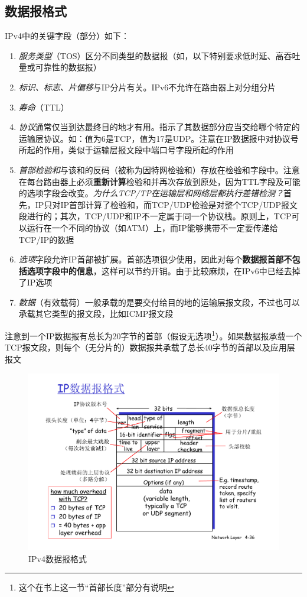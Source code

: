 \documentclass[]{report}
\begin{document}
		\subsection{数据报格式}
		IPv4中的关键字段（部分）如下：
		\begin{enumerate}
			\item \textit{服务类型}（TOS）区分不同类型的数据报（如，以下特别要求低时延、高吞吐量或可靠性的数据报）
			\item \textit{标识、标志、片偏移}与IP分片有关。IPv6不允许在路由器上对分组分片
			\item \textit{寿命}（TTL）
			\item \textit{协议}通常仅当到达最终目的地才有用。指示了其数据部分应当交给哪个特定的运输层协议。如：值为6是TCP，值为17是UDP。注意在IP数据报中对协议号所起的作用，类似于运输层报文段中端口号字段所起的作用
			\item \textit{首部检验和}与该和的反码（被称为因特网检验和）存放在检验和字段中。注意在每台路由器上必须\textbf{重新计算}检验和并再次存放到原处，因为TTL字段及可能的选项字段会改变。\textit{为什么TCP/TP在运输层和网络层都执行差错检测？}首先，IP只对IP首部计算了检验和，而TCP/UDP检验是对整个TCP/UDP报文段进行的；其次，TCP/UDP和IP不一定属于同一个协议栈。原则上，TCP可以运行在一个不同的协议（如ATM）上，而IP能够携带不一定要传递给TCP/IP的数据
			\item \textit{选项}字段允许IP首部被扩展。首部选项很少使用，因此对每个\textbf{数据报首部不包括选项字段中的信息}，这样可以节约开销。由于比较麻烦，在IPv6中已经去掉了IP选项
			\item \textit{数据}（有效载荷）一般承载的是要交付给目的地的运输层报文段，不过也可以承载其它类型的报文段，比如ICMP报文段
		\end{enumerate}
		注意到一个IP数据报有总长为20字节的首部（假设无选项\footnote{这个在书上这一节“首部长度”部分有说明}）。如果数据报承载一个TCP报文段，则每个（无分片的）数据报共承载了总长40字节的首部以及应用层报文
		\begin{figure}[h]
			\centering
			\begin{minipage}{40em}
				\centering
				\includegraphics[scale = 0.4]{images/IPv4_Datagram_Style.pdf}
				\caption{IPv4数据报格式}
			\end{minipage}
		\end{figure}
\end{document}
